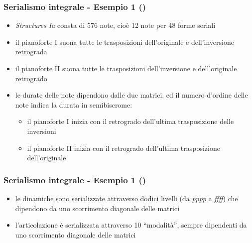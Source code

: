\begin{frame}
    \frametitle{Serialismo integrale - Esempio 1 ()}

    \begin{itemize}

        \item \emph{Structures Ia} consta di 576 note,
                cio\`e 12 note per 48 forme seriali

        \item il pianoforte I suona tutte le trasposizioni
            dell'originale e dell'inversione retrograda

        \item il pianoforte II suona tutte le trasposizioni
            dell'inversione e dell'originale retrogrado

        \item le durate delle note dipendono dalle due matrici,
              ed il numero d'ordine delle note indica la durata
                in semibiscrome:

            \begin{itemize}

                \item il pianoforte I inizia con il retrogrado
                      dell'ultima trasposizione delle inversioni

                \item il pianoforte II inizia con il retrogrado
                      dell'ultima trasposizione dell'originale

            \end{itemize}

    \end{itemize}

\end{frame}

\begin{frame}
    \frametitle{Serialismo integrale - Esempio 1 ()}

    \begin{itemize}
        \item le dinamiche sono serializzate attraverso
            dodici livelli (da \emph{pppp} a \emph{ffff})
            che dipendono da uno scorrimento diagonale
            delle matrici

        \item l'articolazione \`e serializzata attraverso
              10 ``modalit\`a'', sempre dipendenti da
              uno scorrimento diagonale delle matrici

    \end{itemize}

\end{frame}


